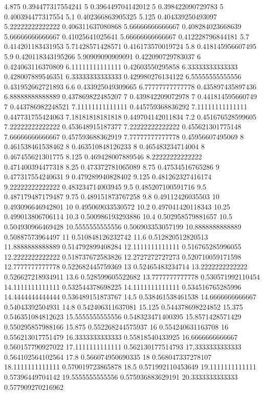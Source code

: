 {4.875 0.394477317554241
5 0.396449704142012
5 0.398422090729783
5 0.400394477317554
5.1 0.402366863905325
5.125 0.404339250493097
5.22222222222222 0.406311637080868
5.66666666666667 0.408284023668639
5.66666666666667 0.41025641025641
5.66666666666667 0.412228796844181
5.7 0.414201183431953
5.71428571428571 0.416173570019724
5.8 0.418145956607495
5.9 0.420118343195266
5.90909090909091 0.422090729783037
6 0.424063116370809
6.11111111111111 0.42603550295858
6.33333333333333 0.428007889546351
6.33333333333333 0.429980276134122
6.55555555555556 0.431952662721893
6.6 0.433925049309665
6.77777777777778 0.435897435897436
6.88888888888889 0.437869822485207
7 0.439842209072978
7 0.441814595660749
7 0.443786982248521
7.11111111111111 0.445759368836292
7.11111111111111 0.447731755424063
7.18181818181818 0.449704142011834
7.2 0.451676528599605
7.22222222222222 0.453648915187377
7.22222222222222 0.455621301775148
7.66666666666667 0.457593688362919
7.77777777777778 0.45956607495069
8 0.461538461538462
8 0.463510848126233
8 0.465483234714004
8 0.467455621301775
8.125 0.469428007889546
8.22222222222222 0.471400394477318
8.25 0.473372781065089
8.75 0.47534516765286
9 0.477317554240631
9 0.479289940828402
9.125 0.481262327416174
9.22222222222222 0.483234714003945
9.5 0.485207100591716
9.5 0.487179487179487
9.75 0.489151873767258
9.8 0.49112426035503
10 0.493096646942801
10 0.495069033530572
10.2 0.497041420118343
10.25 0.499013806706114
10.3 0.500986193293886
10.4 0.502958579881657
10.5 0.504930966469428
10.5555555555556 0.506903353057199
10.8888888888889 0.50887573964497
11 0.510848126232742
11.6 0.512820512820513
11.8888888888889 0.514792899408284
12.1111111111111 0.516765285996055
12.2222222222222 0.518737672583826
12.2727272727273 0.520710059171598
12.7777777777778 0.522682445759369
13 0.52465483234714
13.2222222222222 0.526627218934911
13.6 0.528599605522682
13.7777777777778 0.530571992110454
14.1111111111111 0.532544378698225
14.1111111111111 0.534516765285996
14.4444444444444 0.536489151873767
14.5 0.538461538461538
14.6666666666667 0.54043392504931
14.8 0.542406311637081
15.125 0.544378698224852
15.375 0.546351084812623
15.5555555555556 0.548323471400395
15.8571428571429 0.550295857988166
15.875 0.552268244575937
16 0.554240631163708
16 0.556213017751479
16.3333333333333 0.55818540433925
16.6666666666667 0.560157790927022
17.1111111111111 0.562130177514793
17.3333333333333 0.564102564102564
17.8 0.566074950690335
18 0.568047337278107
18.1111111111111 0.570019723865878
18.5 0.571992110453649
19.1111111111111 0.57396449704142
19.5555555555556 0.575936883629191
20.3333333333333 0.577909270216962
}
